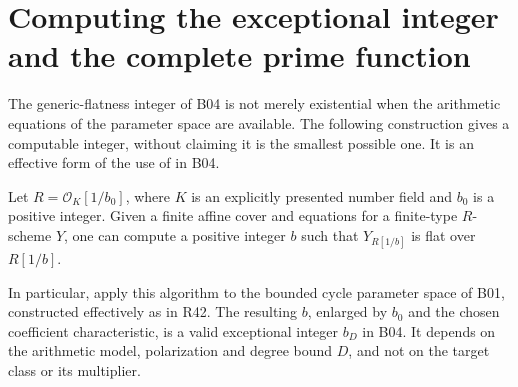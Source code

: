 \section{Computing the exceptional integer and the complete prime function}
\label{sec:effective-exception}

The generic-flatness integer of B04 is not merely existential when the
arithmetic equations of the parameter space are available. The following
construction gives a computable integer, without claiming it is the
smallest possible one. It is an effective form of the use of
\cite[Theorem 6.9.1]{EGAIV2} in B04.

\begin{proposition}
\label{prop:R44}
Let $R=\mathcal O_K[1/b_0]$, where $K$ is an explicitly presented number
field and $b_0$ is a positive integer. Given a finite affine cover and
equations for a finite-type $R$-scheme $Y$, one can compute a positive
integer $b$ such that $Y_{R[1/b]}$ is flat over $R[1/b]$.

In particular, apply this algorithm to the bounded cycle parameter space
of B01, constructed effectively as in R42. The resulting $b$, enlarged
by $b_0$ and the chosen coefficient characteristic, is a valid
exceptional integer $b_D$ in B04. It depends on the arithmetic model,
polarization and degree bound $D$, and not on the target class or its
multiplier.
\end{proposition}

